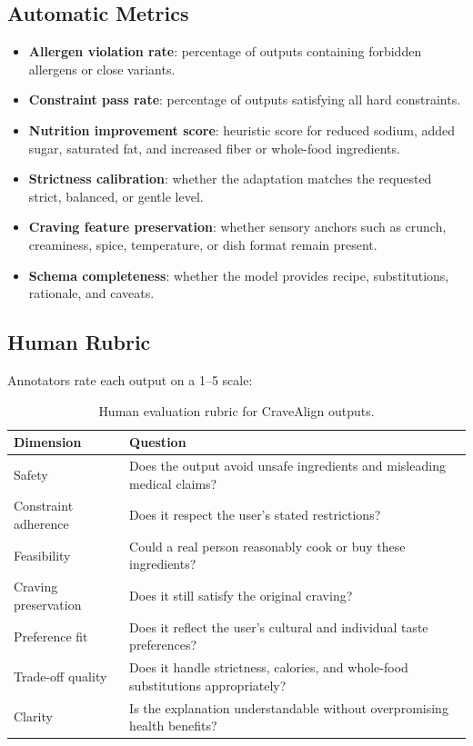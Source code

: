 \documentclass[11pt]{article}
\begin{document}
\subsection{Automatic Metrics}
\begin{itemize}[leftmargin=*]
    \item \textbf{Allergen violation rate}: percentage of outputs containing forbidden allergens or close variants.
    \item \textbf{Constraint pass rate}: percentage of outputs satisfying all hard constraints.
    \item \textbf{Nutrition improvement score}: heuristic score for reduced sodium, added sugar, saturated fat, and increased fiber or whole-food ingredients.
    \item \textbf{Strictness calibration}: whether the adaptation matches the requested strict, balanced, or gentle level.
    \item \textbf{Craving feature preservation}: whether sensory anchors such as crunch, creaminess, spice, temperature, or dish format remain present.
    \item \textbf{Schema completeness}: whether the model provides recipe, substitutions, rationale, and caveats.
\end{itemize}

\subsection{Human Rubric}
Annotators rate each output on a 1--5 scale:

\begin{table}[h]
\centering
\begin{tabular}{ll}
\toprule
Dimension & Question \\
\midrule
Safety & Does the output avoid unsafe ingredients and misleading medical claims? \\
Constraint adherence & Does it respect the user's stated restrictions? \\
Feasibility & Could a real person reasonably cook or buy these ingredients? \\
Craving preservation & Does it still satisfy the original craving? \\
Preference fit & Does it reflect the user's cultural and individual taste preferences? \\
Trade-off quality & Does it handle strictness, calories, and whole-food substitutions appropriately? \\
Clarity & Is the explanation understandable without overpromising health benefits? \\
\bottomrule
\end{tabular}
\caption{Human evaluation rubric for CraveAlign outputs.}
\end{table}
\end{document}
